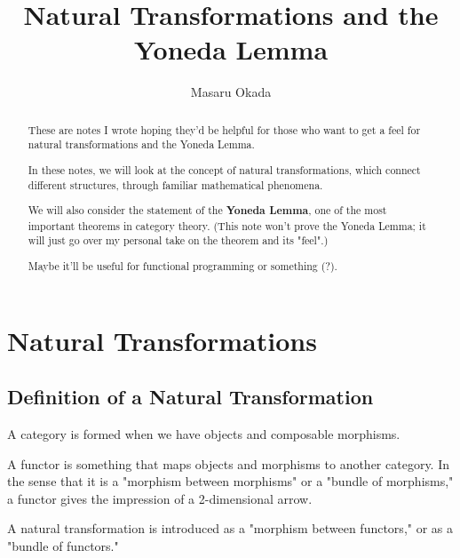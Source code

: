 \documentclass[uplatex,a4j,12pt,dvipdfmx]{jsarticle}
\title{
\textbf{Natural Transformations and the Yoneda Lemma}
}
\author{
Masaru Okada
}
\begin{document}
\maketitle

\begin{abstract}
	These are notes I wrote hoping they'd be helpful for those who want to get a feel for natural transformations and the Yoneda Lemma.

	In these notes, we will look at the concept of natural transformations, which connect different structures, through familiar mathematical phenomena.

	We will also consider the statement of the \textbf{Yoneda Lemma}, one of the most important theorems in category theory.
	(This note won't prove the Yoneda Lemma; it will just go over my personal take on the theorem and its "feel".)

	Maybe it'll be useful for functional programming or something (?).


\end{abstract}

\section{Natural Transformations}

\subsection{Definition of a Natural Transformation}

A category is formed when we have objects and composable morphisms.

A functor is something that maps objects and morphisms to another category.
In the sense that it is a "morphism between morphisms" or a "bundle of morphisms," a functor gives the impression of a 2-dimensional arrow.

A natural transformation is introduced as a "morphism between functors," or as a "bundle of functors."
\end{document}
